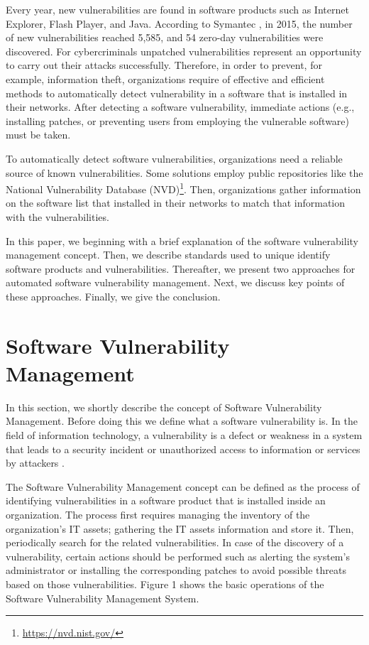 \documentclass{llncs}
\begin{document}
\par Every year, new vulnerabilities are found in software products such as Internet Explorer, Flash 
 Player, and Java. According to Symantec \cite{symantec}, in 2015, the number of new vulnerabilities 
 reached 5,585, and 54 zero-day vulnerabilities were discovered. For cybercriminals 
 unpatched vulnerabilities represent an opportunity to carry out their attacks successfully. 
 Therefore, in order to prevent, for example, information theft, organizations require of 
 effective and efficient methods to automatically detect vulnerability in a software that is installed in 
 their networks. After detecting a software vulnerability, immediate actions (e.g., installing 
 patches, or preventing users from employing the vulnerable software) must be taken. 
 \par To automatically detect software vulnerabilities, organizations need a reliable source of 
 known vulnerabilities. Some solutions employ public repositories like the National 
 Vulnerability Database (NVD)\footnote{\url{https://nvd.nist.gov/}}. Then, organizations gather information on the software list that  
 installed in their networks to match that information with the vulnerabilities. 
 \par In this paper, we beginning with a brief explanation of the software vulnerability 
 management concept. Then, we describe standards used to unique identify software products 
 and vulnerabilities. Thereafter, we present two approaches for automated software vulnerability management. Next, we discuss key points of these approaches. Finally, we give the conclusion.
       
\section{Software Vulnerability Management}

In this section, we shortly describe the concept of Software Vulnerability Management. Before doing this we define what a software vulnerability is. In the field of information technology, a vulnerability is a defect or weakness in a system that leads to a security incident or unauthorized access to information or services by attackers \cite{vuln}.  

\par The Software Vulnerability Management concept can be defined as the process of identifying vulnerabilities in a software product that is installed inside an organization. The process first requires managing the inventory of the organization's IT assets; gathering the IT assets information and store it. Then,  periodically search for the related vulnerabilities. In case of the discovery of a vulnerability, certain actions should be performed such as alerting the system's administrator or installing the corresponding patches to avoid possible threats based on those vulnerabilities. Figure 1 shows the basic operations of the Software Vulnerability Management System.
\end{document}
